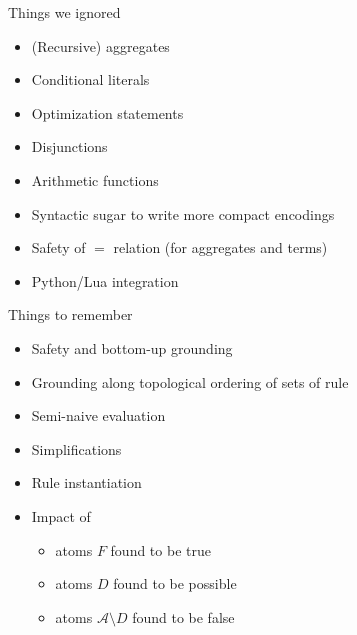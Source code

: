 \begin{frame}{Things we ignored}
  \bigskip
  \begin{itemize}
  \item (Recursive) aggregates
  \item Conditional literals
  \item Optimization statements
  \item Disjunctions
  \item Arithmetic functions
  \item Syntactic sugar to write more compact encodings
  \item Safety of \(=\) relation (for aggregates and terms)
  \item Python/Lua integration
  \end{itemize}
\end{frame}
\begin{frame}{Things to remember}
  \bigskip
  \begin{itemize}
  \item Safety and bottom-up grounding
  \item Grounding along topological ordering of sets of rule
  \item Semi-naive evaluation
  \item Simplifications
  \item Rule instantiation
    \medskip
  \item<2-> Impact of
    \begin{itemize}\normalsize
    \item atoms $F$ found to be true
    \item atoms $D$ found to be possible %
    \item atoms $\mathcal{A}\setminus D$ found to be false
    \end{itemize}
  \end{itemize}
\end{frame}
%
